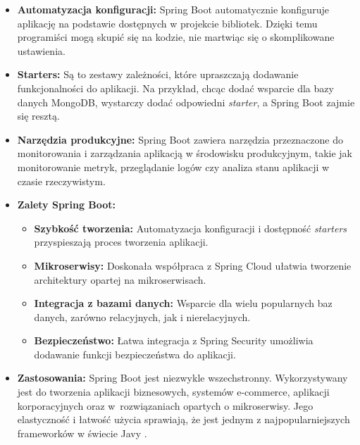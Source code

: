 \begin{itemize}
\item \textbf{Automatyzacja konfiguracji:} Spring Boot automatycznie konfiguruje aplikację na podstawie dostępnych w projekcie bibliotek. Dzięki temu programiści mogą skupić się na kodzie, nie martwiąc się o skomplikowane ustawienia.
\item \textbf{Starters:} Są to zestawy zależności, które upraszczają dodawanie funkcjonalności do aplikacji. Na przykład, chcąc dodać wsparcie dla bazy danych MongoDB, wystarczy dodać odpowiedni \textit{starter}, a Spring Boot zajmie się resztą.

\item \textbf{Narzędzia produkcyjne:} Spring Boot zawiera narzędzia przeznaczone do monitorowania i zarządzania aplikacją w środowisku produkcyjnym, takie jak monitorowanie metryk, przeglądanie logów czy analiza stanu aplikacji w czasie rzeczywistym.

\item \textbf{Zalety Spring Boot:}
\begin{itemize}
    \item \textbf{Szybkość tworzenia:} Automatyzacja konfiguracji i dostępność
    \textit{starters} przyspieszają proces tworzenia aplikacji.
    \item \textbf{Mikroserwisy:} Doskonała współpraca z Spring Cloud ułatwia tworzenie architektury opartej na mikroserwisach.
    \item \textbf{Integracja z bazami danych:} Wsparcie dla wielu popularnych baz danych, zarówno relacyjnych, jak i nierelacyjnych.
    \item \textbf{Bezpieczeństwo:} Łatwa integracja z Spring Security umożliwia dodawanie funkcji bezpieczeństwa do aplikacji.
\end{itemize}

\item \textbf{Zastosowania:} Spring Boot jest niezwykle wszechstronny. Wykorzystywany jest do tworzenia aplikacji biznesowych, systemów e-commerce, aplikacji korporacyjnych oraz w~rozwiązaniach opartych o mikroserwisy. Jego elastyczność i łatwość użycia sprawiają, że jest jednym z najpopularniejszych frameworków w świecie Javy \cite{springbootSpecs}.
\end{itemize}

